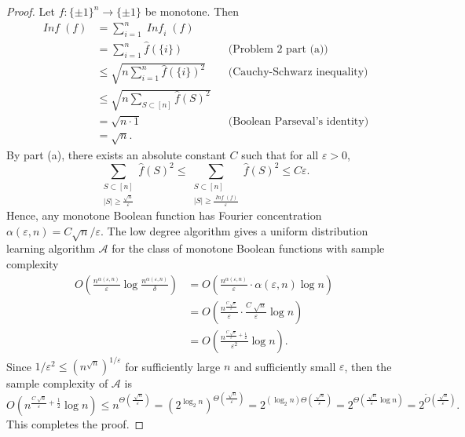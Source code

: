 \documentclass[letterpaper, reqno,11pt]{article}
\DeclareMathOperator{\Inf}{\mathit{Inf}}
\begin{document}
\begin{enumerate}
\begin{enumerate}
    \begin{proof}
      Let $f : \{ \pm 1 \}^n \to \{ \pm 1 \}$ be monotone. Then
      \begin{align*}
        \Inf(f) &= \sum_{i = 1}^n \Inf_i(f) \\
        &= \sum_{i = 1}^n \hat{f}(\{ i \}) && \text{(Problem 2 part (a))} \\
        &\leq \sqrt{n\sum_{i = 1}^n \hat{f}(\{ i \})^2} && \text{(Cauchy-Schwarz inequality)} \\
        &\leq \sqrt{n\sum_{S \subset [n]} \hat{f}(S)^2} \\
        &= \sqrt{n \cdot 1} && \text{(Boolean Parseval's identity)} \\
        &= \sqrt{n}.
      \end{align*}
      By part (a), there exists an absolute constant $C$ such that for all $\varepsilon > 0$,
      $$ \sum_{\substack{S \subset [n] \\ |S| \geq \frac{\sqrt{n}}{\varepsilon}}} \hat{f}(S)^2 \leq \sum_{\substack{S \subset [n] \\ |S| \geq \frac{\Inf(f)}{\varepsilon}}} \hat{f}(S)^2 \leq C\varepsilon. $$
      Hence, any monotone Boolean function has Fourier concentration $\alpha(\varepsilon, n) = C\sqrt{n}/\varepsilon$. The low degree algorithm gives a uniform distribution learning algorithm $\mathcal A$ for the class of monotone Boolean functions with sample complexity
      \begin{align*}
        O\left(\frac{n^{\alpha(\varepsilon, n)}}{\varepsilon} \log \frac{n^{\alpha(\varepsilon, n)}}{\delta}\right) &= O\left(\frac{n^{\alpha(\varepsilon, n)}}{\varepsilon} \cdot \alpha(\varepsilon, n) \log n\right) \\
        &= O\left(\frac{n^{\frac{C\sqrt[]{n}}{\varepsilon}}}{\varepsilon} \cdot \frac{C\sqrt[]{n}}{\varepsilon} \log n\right) \\
        &= O\left(\frac{n^{\frac{C\sqrt[]{n}}{\varepsilon} + \frac{1}{2}}}{\varepsilon^2} \log n\right).
      \end{align*}
      Since $1/\varepsilon^2 \leq (n^{\sqrt{n}})^{1/\varepsilon}$ for sufficiently large $n$ and sufficiently small $\varepsilon$, then the sample complexity of $\mathcal A$ is
      $$ O\left(n^{\frac{C\sqrt[]{n}}{\varepsilon} + \frac{1}{2}} \log n\right) \leq n^{\Theta\left(\frac{\sqrt[]{n}}{\varepsilon}\right)} = \left(2^{\log_2 n}\right)^{\Theta\left(\frac{\sqrt[]{n}}{\varepsilon}\right)} = 2^{(\log_2 n) \Theta\left(\frac{\sqrt[]{n}}{\varepsilon}\right)} = 2^{\Theta\left(\frac{\sqrt[]{n}}{\varepsilon} \log n\right)} = 2^{\widetilde{O}\left(\frac{\sqrt[]{n}}{\varepsilon}\right)}. $$
      This completes the proof.
    \end{proof}
  \end{enumerate}
\end{enumerate}
\end{document}
